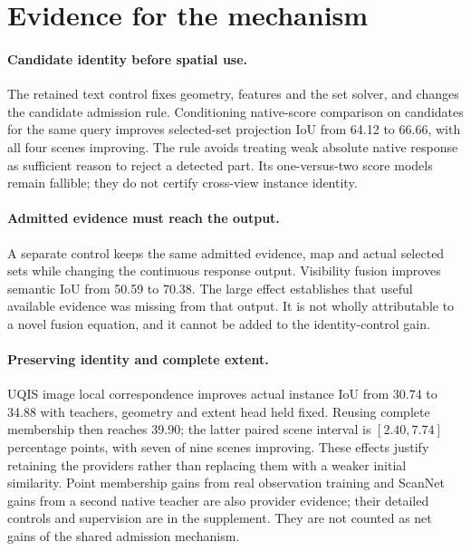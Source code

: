 \documentclass[10pt]{article}
\begin{document}
\section{Evidence for the mechanism}
\paragraph{Candidate identity before spatial use.}
The retained text control fixes geometry, features and the set solver, and
changes the candidate admission rule. Conditioning native-score comparison on
candidates for the same query improves selected-set projection IoU from 64.12
to 66.66, with all four scenes improving. The rule avoids treating weak absolute
native response as sufficient reason to reject a detected part. Its one-versus-two
score models remain fallible; they do not certify cross-view instance identity.

\paragraph{Admitted evidence must reach the output.}
A separate control keeps the same admitted evidence, map and actual selected
sets while changing the continuous response output. Visibility fusion improves
semantic IoU from 50.59 to 70.38. The large effect establishes that useful
available evidence was missing from that output. It is not wholly attributable
to a novel fusion equation, and it cannot be added to the identity-control gain.

\begin{table}[ht]
\centering\small
\resizebox{\linewidth}{!}{}
\caption{Historical controlled effects tied to the component actually changed.
The first two rows support the mechanism locally. The final two justify
preserving effective identity and complete-extent providers.}
\label{tab:mechanism}
\end{table}

\paragraph{Preserving identity and complete extent.}
UQIS image local correspondence improves actual instance IoU from 30.74 to
34.88 with teachers, geometry and extent head held fixed. Reusing complete
membership then reaches 39.90; the latter paired scene interval is
$[2.40,7.74]$ percentage points, with seven of nine scenes improving.
These effects justify retaining the providers rather than replacing them with
a weaker initial similarity. Point membership gains from real observation
training and ScanNet gains from a second native teacher are also provider
evidence; their detailed controls and supervision are in the supplement.
They are not counted as net gains of the shared admission mechanism.
\end{document}
